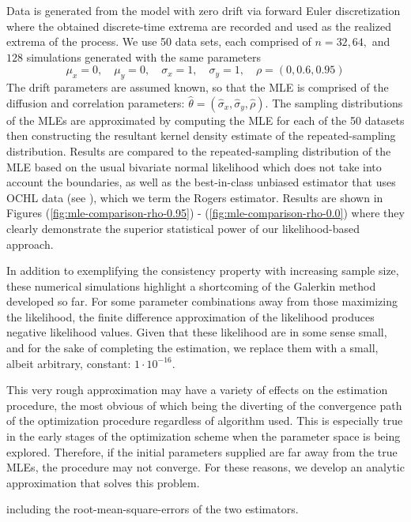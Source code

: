 Data is generated from the model with zero drift via forward Euler
discretization where the obtained discrete-time extrema are recorded
and used as the realized extrema of the process. We use 50 data sets,
each comprised of $n = 32, 64,$ and $128$ simulations generated with
the same parameters
\[
  \mu_x = 0,\quad \mu_y  = 0,\quad \sigma_x = 1,\quad \sigma_y = 1,\quad \rho = (0, 0.6, 0.95)
\]
The drift parameters are assumed known, so that the MLE is comprised
of the diffusion and correlation parameters:
$\hat{\theta} = (\hat{\sigma}_x, \hat{\sigma}_y, \hat{\rho}).$ The
sampling distributions of the MLEs are approximated by computing the
MLE for each of the 50 datasets then constructing the resultant kernel
density estimate of the repeated-sampling distribution. Results are
compared to the repeated-sampling distribution of the MLE based on the
usual bivariate normal likelihood which does not take into account the
boundaries, as well as the best-in-class unbiased estimator that uses
OCHL data (see \cite{rogers2008estimating}), which we term the Rogers
estimator.  Results are shown in Figures (\ref{fig:mle-comparison-rho-0.95}) - (\ref{fig:mle-comparison-rho-0.0})
where they clearly demonstrate the superior statistical power of our
likelihood-based approach.

In addition to exemplifying the consistency property with increasing
sample size, these numerical simulations highlight a shortcoming of
the Galerkin method developed so far. For some parameter combinations
away from those maximizing the likelihood, the finite difference
approximation of the likelihood produces negative likelihood
values. Given that these likelihood are in some sense small, and for
the sake of completing the estimation, we replace them with a small,
albeit arbitrary, constant: $1\cdot 10^{-16}$.

This very rough approximation may have a variety of effects on the
estimation procedure, the most obvious of which being the diverting of
the convergence path of the optimization procedure regardless of
algorithm used. This is especially true in the early stages of the
optimization scheme when the parameter space is being
explored. Therefore, if the initial parameters supplied are far away
from the true MLEs, the procedure may not converge. For these reasons,
we develop an analytic approximation that solves this problem.

including the root-mean-square-errors of the two
estimators.

